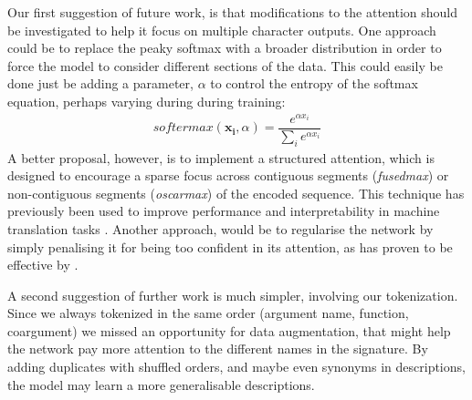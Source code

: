 Our first suggestion of future work, is that modifications to the attention should be investigated to help it focus on multiple character outputs. 
One approach could be to replace the peaky softmax with a broader distribution in order to force the model to consider different sections of the data.
This could easily be done just be adding a parameter, $\alpha$ to control the entropy of the softmax equation, perhaps varying during during training:
\begin{align}
softermax(\mathbf{x_i}, \alpha) = \dfrac{e^{{\alpha}x_i}}{\sum_ie^{{\alpha}x_i}}
\end{align}
A better proposal, however, is to implement a structured attention, which is designed to encourage a sparse focus across contiguous segments (\textit{fusedmax}) or non-contiguous segments (\textit{oscarmax}) of the encoded sequence. \citep{niculae_regularized_2017}
This technique has previously been used to improve performance and interpretability in machine translation tasks 
\citep{niculae_regularized_2017}.
Another approach, would be to regularise the network by simply penalising it for being too confident in its attention, as has proven to be effective by \citet{pereyra_regularizing_2017}.

A second suggestion of further work is much simpler, involving our tokenization. Since we always tokenized in the same order (argument name, function, coargument) we missed an opportunity for data augmentation, that might help the network pay more attention to the different names in the signature. By adding duplicates with shuffled orders, and maybe even synonyms in descriptions, the model may learn a more generalisable descriptions.


